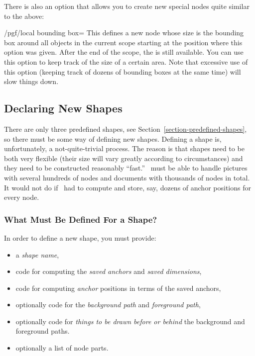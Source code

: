 There is also an option that allows you to create new special nodes
quite similar to the above:
\begin{key}{/pgf/local bounding box=}
  This defines a new node  whose size is the bounding
  box around all objects in the current scope starting at the position
  where this option was given. After the end of the scope, the  is still available. You can use this option to keep track of
  the size of a certain area. Note that excessive use of this option
  (keeping track of dozens of bounding boxes at the same time)
  will slow things down.
\begin{codeexample}[]
\end{codeexample}
\end{key}


\subsection{Declaring New Shapes}

There are only three predefined shapes, see
Section~\ref{section-predefined-shapes}, so there must be some way of
defining new shapes. Defining a shape is, unfortunately, a
not-quite-trivial process. The reason is that shapes need to be both
very flexible (their size will vary greatly according to
circumstances) and they need to be constructed reasonably ``fast.''
\pgfname\ must be able to handle pictures with several hundreds of
nodes and documents with thousands of nodes in total. It would not do
if \pgfname\ had to compute and store, say, dozens of anchor positions
for every node.


\subsubsection{What Must Be Defined For a Shape?}

In order to define a new shape, you must provide:
\begin{itemize}
\item
  a \emph{shape name},
\item
  code for computing the  \emph{saved anchors} and \emph{saved
    dimensions},
\item
  code for computing \emph{anchor} positions in terms of the saved anchors,
\item
  optionally code for the \emph{background path} and \emph{foreground path},
\item
  optionally code for \emph{things to be drawn before or behind} the
  background and foreground paths.
\item
  optionally a list of node parts.
\end{itemize}


